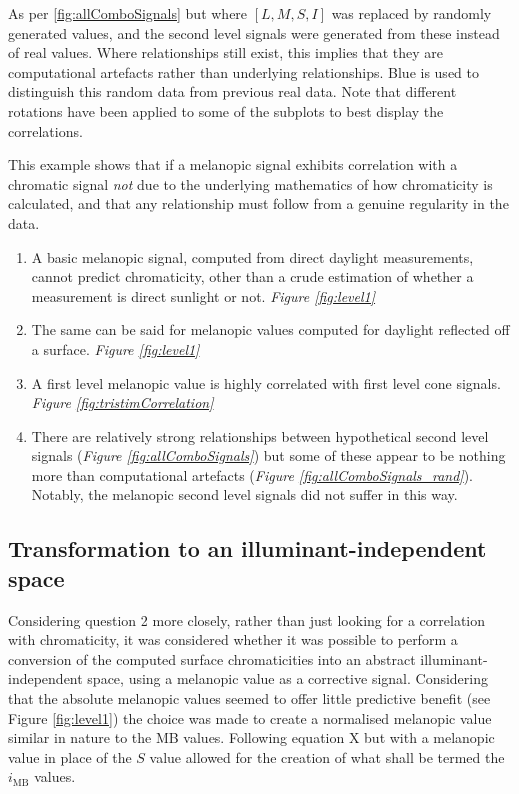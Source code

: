 \begin{fullpagefigure}
\caption{As per \ref{fig:allComboSignals} but where $[L,M,S,I]$ was replaced by randomly generated values, and the second level signals were generated from these instead of real values. Where relationships still exist, this implies that they are computational artefacts rather than underlying relationships. Blue is used to distinguish this random data from previous real data. Note that different rotations have been applied to some of the subplots to best display the correlations.}
\label{fig:allComboSignals_rand}
\end{fullpagefigure}

This example shows that if a melanopic signal exhibits correlation with a chromatic signal \emph{not} due to the underlying mathematics of how chromaticity is calculated, and that any relationship must follow from a genuine regularity in the data.

\begin{enumerate}
   \item A basic melanopic signal, computed from direct daylight measurements, cannot predict chromaticity, other than a crude estimation of whether a measurement is direct sunlight or not. \emph{Figure \ref{fig:level1}}
    \item The same can be said for melanopic values computed for daylight reflected off a surface. \emph{Figure \ref{fig:level1}}
    \item A first level melanopic value is highly correlated with first level cone signals. \emph{Figure \ref{fig:tristimCorrelation}}
    \item There are relatively strong relationships between hypothetical second level signals (\emph{Figure \ref{fig:allComboSignals}}) but some of these appear to be nothing more than computational artefacts (\emph{Figure \ref{fig:allComboSignals_rand}}). Notably, the melanopic second level signals did not suffer in this way.
\end{enumerate}

\subsection{Transformation to an illuminant-independent space}

Considering question 2 more closely, rather than just looking for a correlation with chromaticity, it was considered whether it was possible to perform a conversion of the computed surface chromaticities into an abstract illuminant-independent space, using a melanopic value as a corrective signal. Considering that the absolute melanopic values seemed to offer little predictive benefit (see Figure \ref{fig:level1}) the choice was made to create a normalised melanopic value similar in nature to the MB values. Following equation X %
but with a melanopic value in place of the $S$ value allowed for the creation of what shall be termed the $i_{\text{MB}}$ values.


